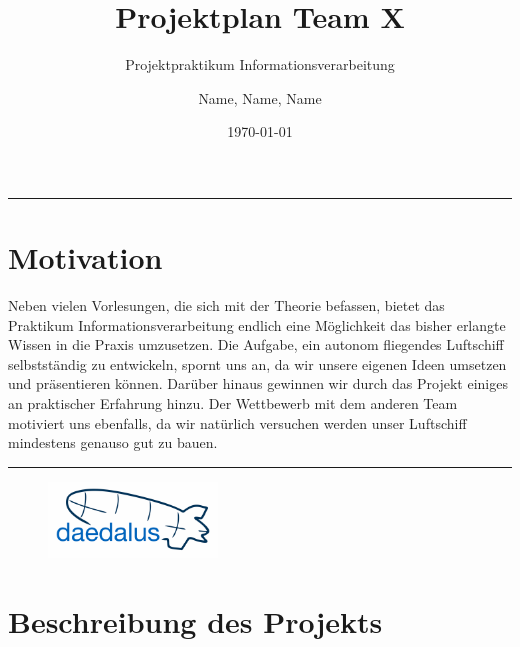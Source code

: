 \documentclass[lang=ngerman,inputenc=utf8,fontsize=10pt]{ldvarticle}
\title{Projektplan Team X}
\subtitle{Projektpraktikum Informationsverarbeitung}
\author{Name, Name, Name}
\date{\today}
\begin{document}
	\maketitle	
	\thispagestyle{empty}
\vspace*{2cm}


\hrule

\section*{Motivation}

Neben vielen Vorlesungen, die sich mit der Theorie befassen, bietet das Praktikum Informationsverarbeitung endlich eine Möglichkeit das bisher erlangte Wissen in die Praxis umzusetzen. Die Aufgabe, ein autonom fliegendes Luftschiff selbstständig zu entwickeln, spornt uns an, da wir unsere eigenen Ideen umsetzen und präsentieren können. Darüber hinaus gewinnen wir durch das Projekt einiges an praktischer Erfahrung hinzu. Der Wettbewerb mit dem anderen Team motiviert uns ebenfalls, da wir natürlich versuchen werden unser Luftschiff mindestens genauso gut zu bauen.   




\vspace*{1cm}
\hrule


\begin{figure}[!b]
\centering
\includegraphics[width=0.4\textwidth]{logo_kl.png}
\end{figure}

\newpage


\section{Beschreibung des Projekts}
\end{document}
